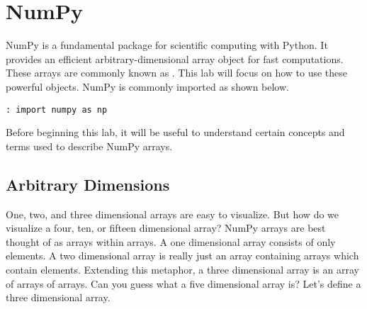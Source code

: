 \begin{problem}
% 
\end{problem}


\section*{NumPy}
NumPy is a fundamental package for scientific computing with Python.
It provides an efficient arbitrary-dimensional array object for fast computations.
These arrays are commonly known as .
This lab will focus on how to use these powerful objects.
NumPy is commonly imported as shown below.

\begin{lstlisting}
: import numpy as np
\end{lstlisting}
Before beginning this lab, it will be useful to understand certain concepts and terms used to describe NumPy arrays.

\subsection*{Arbitrary Dimensions}
One, two, and three dimensional arrays are easy to visualize.
But how do we visualize a four, ten, or fifteen dimensional array?
NumPy arrays are best thought of as arrays within arrays.
A one dimensional array consists of only elements.
A two dimensional array is really just an array containing arrays which contain elements.
Extending this metaphor, a three dimensional array is an array of arrays of arrays.
Can you guess what a five dimensional array is?
Let's define a three dimensional array.

